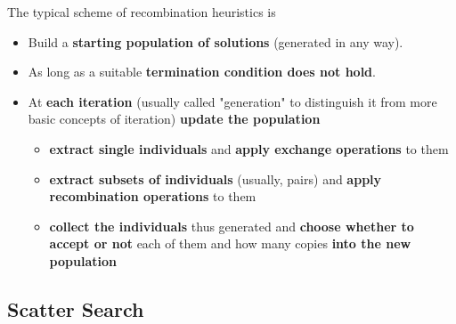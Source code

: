 \documentclass[11pt]{article}
\begin{document}
	The typical scheme of recombination heuristics is
	\begin{itemize}
		\item Build a \textbf{starting population of solutions} (generated in any way).\\
		
		\item As long as a suitable \textbf{termination condition does not hold}.\\
		
		\item At \textbf{each iteration} (usually called "generation" to distinguish it from more basic concepts of iteration) \textbf{update the population}
		\begin{itemize}
			\item \textbf{extract single individuals} and \textbf{apply exchange operations} to them
			\item \textbf{extract subsets of individuals} (usually, pairs) and \textbf{apply recombination operations} to them
			\item \textbf{collect the individuals} thus generated and \textbf{choose whether to accept or not} each of them and how many copies \textbf{into the new population}
		\end{itemize}
		
	\end{itemize}
	
	\newpage
	
	\subsection{Scatter Search}
	
\end{document}
